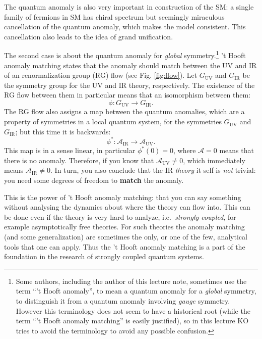 \documentclass[
]{scrartcl}
\begin{document}
The quantum anomaly is also very important in construction of the SM: a single family of fermions in SM has chiral spectrum but seemingly miraculous cancellation of the quantum anomaly, which makes the model consistent. This cancellation also leads to the idea of grand unification.

The second case is about the quantum anomaly for \emph{global} symmetry.\footnote{Some authors, including the author of this lecture note, sometimes use the term ``'t Hooft anomaly'', to mean a quantum anomaly for a \emph{global} symmetry, to distinguish it from a quantum anomaly involving \emph{gauge} symmetry. However this terminology does not seem to have a historical root (while the term ``'t Hooft anomaly matching'' is easily justified), so in this lecture KO tries to avoid the terminology to avoid any possible confusion.}
't Hooft anomaly matching states that the anomaly should match between the UV and IR of an renormalization group (RG) flow (see Fig. \ref{fig:flow}).
Let \(G_\text{UV}\) and \(G_\text{IR}\) be the symmetry group for the UV and IR theory, respectively.
The existence of the RG flow between them in particular means that an isomorphism between them:
\begin{equation}
  \label{eq:Ghom}
  \phi: G_\text{UV} \to G_\text{IR}.
\end{equation}
The RG flow also assigns a map between the quantum anomalies, which are a property of symmetries in a local quantum system, for the symmetries \(G_\text{UV}\) and \(G_\text{IR}\);
but this time it is backwards:
\begin{equation}
  \label{eq:pullback}
  \phi^*: \mathcal{A}_\text{IR} \to \mathcal{A}_\text{UV}.
\end{equation}
This map is in a sense linear, in particular \(\phi^* (0) = 0\), where \(\mathcal{A}=0\) means that there is no anomaly.
Therefore, if you know that \(\mathcal{A}_\text{UV}\neq 0\), which immediately means \(\mathcal{A}_\text{IR}\neq 0\).
In turn, you also conclude that the IR \emph{theory} it self is \emph{not} trivial: you need some degrees of freedom to \textbf{match} the anomaly.

This is the power of 't Hooft anomaly matching: that you can say something without analysing the dynamics about where the theory can flow into.
This can be done even if the theory is very hard to analyze, i.e.~\emph{strongly coupled}, for example asymptotically free theories.
For such theories the anomaly matching (and some generalization) are sometimes the only, or one of the few, analytical tools that one can apply.
Thus the 't Hooft anomaly matching is a part of the foundation in the research of strongly coupled quantum systems.
\end{document}
